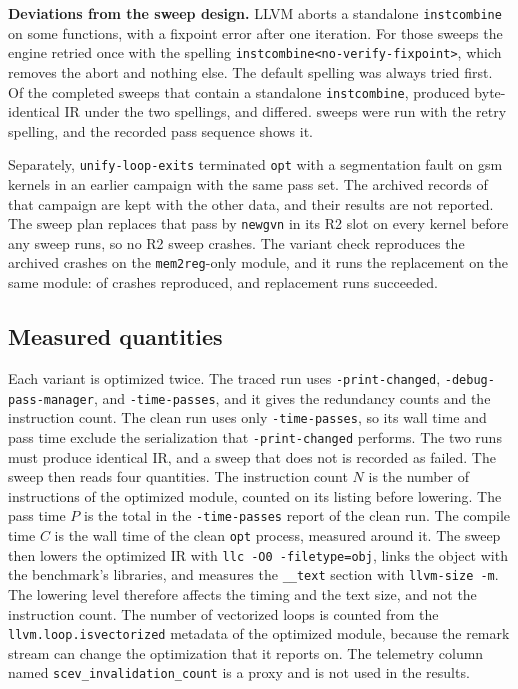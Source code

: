 \textbf{Deviations from the sweep design.} LLVM \LLVMVersion{} aborts a standalone \texttt{instcombine} on some functions, with a
fixpoint error after one iteration. For those sweeps the engine retried once with the spelling
\texttt{instcombine<\allowbreak{}\allowbreak no-verify-fixpoint>}, which removes the abort and nothing else. The default spelling was always
tried first. Of the \SpellingCandidates{} completed sweeps that contain a standalone \texttt{instcombine}, \SpellingIdentical{}
produced byte-identical IR under the two spellings, and \SpellingDiffering{} differed. \RetriedSweeps{} sweeps were run with the
retry spelling, and the recorded pass sequence shows it.

Separately, \texttt{unify-loop-exits} terminated \texttt{opt} with a segmentation fault on \ArchivedCrashes{} gsm kernels in an earlier campaign with the same pass set. The archived records of that campaign are kept with the other data, and their results are not reported. The sweep plan replaces that pass by \texttt{newgvn} in its R2 slot on every kernel before any sweep runs, so no R2 sweep crashes. The variant check reproduces the archived crashes on the \texttt{mem2reg}-only module, and it runs the replacement on the same module: \ArchivedCrashesReproduced{} of \ArchivedCrashes{} crashes reproduced, and \ArchivedReplacementRuns{} replacement runs succeeded.

\subsection{Measured quantities}

Each variant is optimized twice. The traced run uses \texttt{-print-changed}, \texttt{-debug-pass-manager}, and \texttt{-time-passes}, and it gives the redundancy counts and the instruction count. The clean run uses only \texttt{-time-passes}, so its wall time and pass time exclude the serialization that \texttt{-print-changed} performs. The two runs must produce identical IR, and a sweep that does not is recorded as failed. The sweep then reads four quantities. The instruction count $N$ is the number of instructions of the optimized module, counted on its listing before lowering. The pass time $P$ is the total in the \texttt{-time-passes} report of the clean run. The compile time $C$ is the wall time of the clean \texttt{opt} process, measured around it. The sweep then lowers the optimized IR with \texttt{llc -O0 -filetype=obj}, links the object with the benchmark's libraries, and measures the \texttt{\_\allowbreak{}\_\allowbreak{}text} section with \texttt{llvm-size -m}. The lowering level therefore affects the timing and the text size, and not the instruction count. The number of vectorized loops is counted from the \texttt{llvm.\allowbreak{}loop.\allowbreak{}isvectorized} metadata of the optimized module, because the remark stream can change the optimization that it reports on. The telemetry column named \texttt{scev\_\allowbreak{}invalidation\_\allowbreak{}count} is a proxy and is not used in the results.

